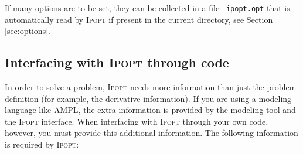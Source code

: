 \documentclass[10pt]{article}
\newcommand{\Ipopt}{\textsc{Ipopt}\xspace}
\begin{document}
If many options are to be set, they can be collected in a file {\tt
  ipopt.opt} that is automatically read by \Ipopt if present in
the current directory, see Section \ref{sec:options}.


\subsection{Interfacing with \Ipopt through code}
\label{sec.required_info}
In order to solve a problem, \Ipopt needs more information than just
the problem definition (for example, the derivative information). If
you are using a modeling language like AMPL, the extra information is
provided by the modeling tool and the \Ipopt interface. When
interfacing with \Ipopt through your own code, however, you must
provide this additional information.
The following information is required by \Ipopt:
\end{document}
